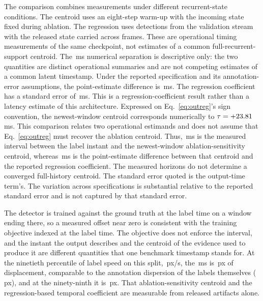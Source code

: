 \documentclass[10pt,twocolumn,letterpaper]{article}
\begin{document}
The comparison combines measurements under different recurrent-state conditions.
The centroid uses an eight-step warm-up with the incoming state fixed during
ablation. The regression uses detections from the validation stream with the
released state carried across frames. These are operational timing measurements
of the same checkpoint, not estimates of a common full-recurrent-support
centroid. The \outInterval\,ms numerical separation is descriptive only: the two quantities are
distinct operational summaries and are not competing estimates of a common latent timestamp.
Under the reported specification and its
annotation-error assumptions, the point-estimate difference is \outInterval\,ms. The regression
coefficient has a standard error of \outIntervalSE\,ms. This is a regression-coefficient
result rather than a latency estimate of this architecture. Expressed on Eq.~\ref{eq:outreg}'s
sign convention, the newest-window centroid corresponds
numerically to $\tau=+23.81$\,ms. This comparison relates two operational
estimands and does not assume that Eq.~\ref{eq:outreg} must recover the ablation centroid.
Thus, \rvtCentroidMagMeas\,ms is the measured interval between the label
instant and the newest-window ablation-sensitivity centroid, whereas \outInterval\,ms
is the point-estimate difference between that centroid and the reported regression
coefficient. The measured horizons do not determine a converged full-history centroid. The standard
error quoted is the output-time term's. The variation across specifications is substantial
relative to the reported standard error and is not captured by that standard error.

The detector is trained against the ground truth at the label time on a window
ending there, so a measured offset near zero is consistent with the training
objective indexed at the label time. The objective
does not enforce the
interval, and the instant the output describes and the centroid of the evidence
used to produce it are different quantities that one benchmark timestamp stands
for. At the ninetieth percentile of label speed on this split, \outSpeedNinety\,px/s, the
\rvtCentroidMagMeas\,ms is \outPxNinety\,px of displacement, comparable to the
annotation dispersion of the labels themselves (\,px), and at the
ninety-ninth it is \outPxNinetynine\,px. That ablation-sensitivity centroid and
the regression-based temporal coefficient are measurable from released artifacts alone.
\end{document}
